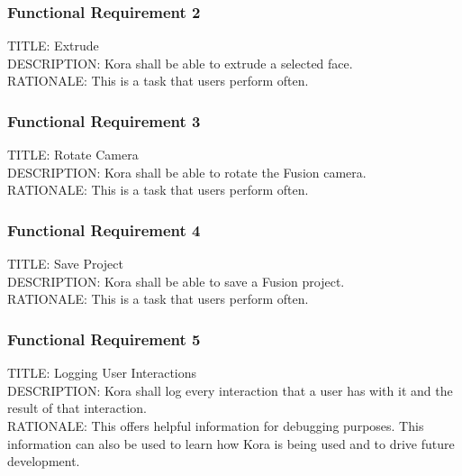 \documentclass[onecolumn, draftclsnofoot,10pt, compsoc]{IEEEtran}
\def \botname{Kora\xspace}
\begin{document}
        \subsubsection{Functional Requirement 2}
        TITLE: Extrude \\
        DESCRIPTION: \botname shall be able to extrude a selected face. \\
        RATIONALE: This is a task that users perform often.
        
        \subsubsection{Functional Requirement 3}
        TITLE: Rotate Camera \\
        DESCRIPTION: \botname shall be able to rotate the Fusion camera. \\
        RATIONALE: This is a task that users perform often.
        
        \subsubsection{Functional Requirement 4}
        TITLE: Save Project \\
        DESCRIPTION: \botname shall be able to save a Fusion project. \\
        RATIONALE: This is a task that users perform often.
        
        \subsubsection{Functional Requirement 5}
        TITLE: Logging User Interactions \\
        DESCRIPTION: \botname shall log every interaction that a user has with it and the result of that interaction. \\
        RATIONALE: This offers helpful information for debugging purposes. This information can also be used to learn how \botname is being used and to drive future development.
       
\end{document}
